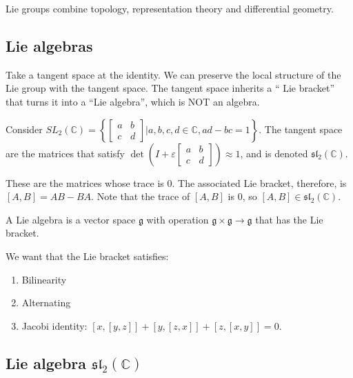 \documentclass[]{report}
\theoremstyle{definition}
\numberwithin{theorem}{section}
\numberwithin{equation}{section}
\begin{document}
Lie groups combine topology, representation theory and differential geometry. 

\subsection{Lie algebras}
Take a tangent space at the identity. We can preserve the local structure of the Lie group with the tangent space. The tangent space inherits a `` Lie bracket'' that turns it into a ``Lie algebra'', which is NOT an algebra.

Consider $SL_2(\mathbb{C}) = \left\{
\begin{bmatrix}
	a & b\\
	c & d
\end{bmatrix}
| a, b, c, d \in \mathbb{C}, ad - bc = 1
\right\}
$. 
The tangent space are the matrices that satisfy $\det\left(I + \varepsilon \begin{bmatrix}
	a & b\\
	c & d
\end{bmatrix} \right) \approx 1$, and is denoted $\mathfrak{sl}_2(\mathbb{C})$.  

These are the matrices whose trace is $0$. The associated Lie bracket, therefore, is $\left[A, B\right] = AB - BA$. Note that the trace of $\left[A, B\right]$ is 0, so $[A, B] \in \mathfrak{sl}_2(\mathbb{C})$. 

A Lie algebra is a vector space $\mathfrak{g}$ with operation $\mathfrak{g} \times \mathfrak{g} \rightarrow \mathfrak{g}$ that has the Lie bracket. 

We want that the Lie bracket satisfies:
\begin{enumerate}
	\item Bilinearity
	\item Alternating
	\item Jacobi identity: $[x, [y,z]] + [y, [z, x]] + [z, [x, y]] = 0$. 
\end{enumerate}

\subsection{Lie algebra $\mathfrak{sl}_2(\mathbb{C})$}
\end{document}
